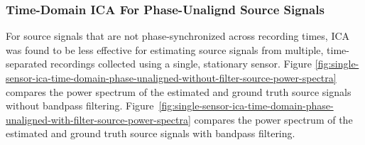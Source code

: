 \documentclass[10pt]{article}
\begin{document}
\subsubsection*{Time-Domain ICA For Phase-Unalignd Source Signals}
For source signals that are not phase-synchronized across recording times, ICA was found to
be less effective for estimating source signals from multiple, time-separated recordings
collected using a single, stationary sensor.
Figure \ref{fig:single-sensor-ica-time-domain-phase-unaligned-without-filter-source-power-spectra}
compares the power spectrum of the estimated and ground truth source signals without
bandpass filtering.
Figure~\ref{fig:single-sensor-ica-time-domain-phase-unaligned-with-filter-source-power-spectra}
compares the power spectrum of the estimated and ground truth source signals with bandpass
filtering.
\end{document}
